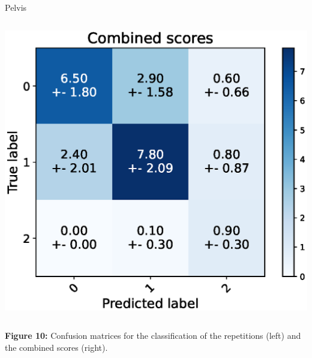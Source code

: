 \begin{frame}[fragile]{Pelvis}
\begin{columns}
    \includegraphics[width=\textwidth]{files/figs/res/pelvis/cnf-combined.eps}
  \end{columns}
  {\scriptsize\newline\textbf{Figure 10:} Confusion matrices for the classification of the repetitions (left) and the combined scores (right).}
\end{frame}

